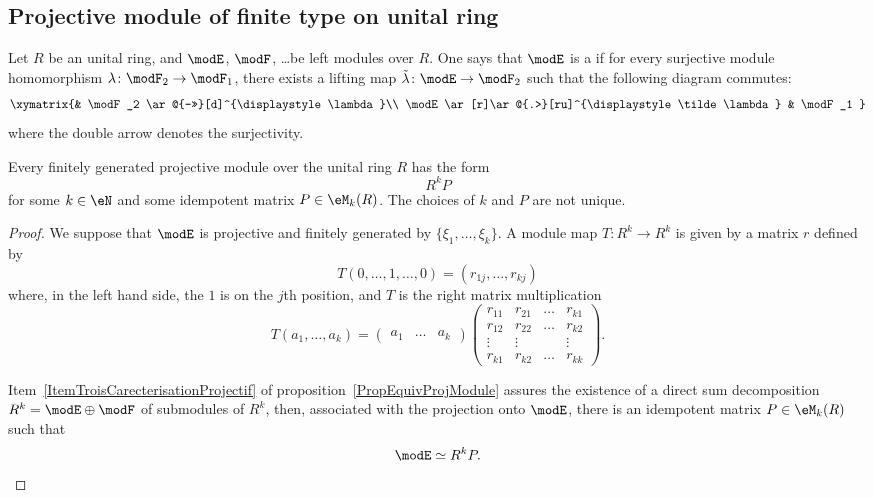 \subsection{Projective module of finite type on unital ring}

%
%

Let $R$ be an unital ring, and $\modE$, $\modF$, \ldots be left modules over $R$. One says that $\modE$ is a  if for every surjective module homomorphism $\lambda\colon \modF_2\to \modF_1$, there exists a lifting map $\tilde\lambda\colon \modE\to \modF_2$ such that the following diagram commutes:
\begin{equation}		\label{EqLiftPropProjModules}
	\xymatrix{%
		&  \modF_2 \ar@{->>}[d]^{\displaystyle\lambda}\\
		\modE \ar[r]\ar@{.>}[ru]^{\displaystyle\tilde\lambda}			&	\modF_1
	}
\end{equation}
where the double arrow denotes the surjectivity.

\begin{proposition}		\label{PropFGPRkP}
	Every finitely generated projective module over the unital ring $R$ has the form
	\[
		R^kP
	\]
	for some $k\in\eN$ and some idempotent matrix $P\in\eM_k(R)$. The choices of $k$ and $P$ are not unique.
\end{proposition}

\begin{proof}
	We suppose that $\modE$ is projective and finitely generated by $\{ \xi_1,\ldots,\xi_k\}$. A module map $T\colon R^k\to R^k$ is given by a matrix $r$ defined by
	\[
		T(0,\ldots,1,\ldots,0)=(r_{1j},\ldots,r_{kj})
	\]
	where, in the left hand side, the $1$ is on the $j$th position, and $T$ is the right matrix multiplication
	\begin{equation}
		T(a_1,\ldots,a_k)=
		\begin{pmatrix}
			a_1 & \ldots & a_k
		\end{pmatrix}
		\begin{pmatrix}
			r_{11} & r_{21} & \ldots & r_{k1} \\
			r_{12} & r_{22} & \ldots & r_{k2} \\
			\vdots & \vdots &        & \vdots \\
			r_{k1} & r_{k2} & \ldots & r_{kk}
		\end{pmatrix}.
	\end{equation}

	Item~\ref{ItemTroisCarecterisationProjectif} of proposition~\ref{PropEquivProjModule} assures the existence of a direct sum decomposition $R^k=\modE\oplus \modF$ of submodules of $R^k$, then, associated with the projection onto $\modE$, there is an idempotent matrix $P\in\eM_k(R)$ such that
	\begin{equation}		\label{EqMRkPdec}
		\modE\simeq R^kP.
	\end{equation}
\end{proof}

